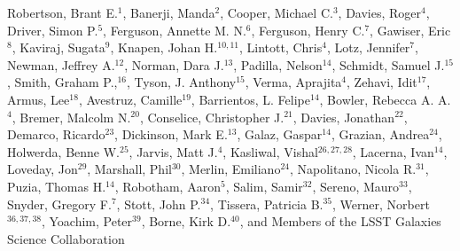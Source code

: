 Robertson, Brant E.$^{1}$, 
Banerji, Manda$^{2}$,
Cooper, Michael C.$^{3}$,
Davies, Roger$^{4}$,
Driver, Simon P.$^{5}$,
Ferguson, Annette M. N.$^{6}$,
Ferguson, Henry C.$^{7}$,
Gawiser, Eric$^{8}$,
Kaviraj, Sugata$^{9}$,
Knapen, Johan H.$^{10,11}$,
Lintott, Chris$^{4}$,
Lotz, Jennifer$^{7}$,
Newman, Jeffrey A.$^{12}$,
Norman, Dara J.$^{13}$,
Padilla, Nelson$^{14}$,
Schmidt, Samuel J.$^{15}$,
Smith, Graham P.,$^{16}$,
Tyson, J. Anthony$^{15}$,
Verma, Aprajita$^{4}$,
Zehavi, Idit$^{17}$,
Armus, Lee$^{18}$,
Avestruz, Camille$^{19}$,
Barrientos, L. Felipe$^{14}$,
Bowler, Rebecca A. A.$^{4}$,
Bremer, Malcolm N.$^{20}$,
Conselice, Christopher J.$^{21}$,
Davies, Jonathan$^{22}$,
Demarco, Ricardo$^{23}$,
Dickinson, Mark E.$^{13}$,
Galaz, Gaspar$^{14}$,
Grazian, Andrea$^{24}$,
Holwerda, Benne W.$^{25}$,
Jarvis, Matt J.$^{4}$,
Kasliwal, Vishal$^{26,27,28}$,
Lacerna, Ivan$^{14}$,
Loveday, Jon$^{29}$,
Marshall, Phil$^{30}$,
Merlin, Emiliano$^{24}$,
Napolitano, Nicola R.$^{31}$,
Puzia, Thomas H.$^{14}$,
Robotham, Aaron$^{5}$,
Salim, Samir$^{32}$,
Sereno, Mauro$^{33}$,
Snyder, Gregory F.$^{7}$,
Stott, John P.$^{34}$,
Tissera, Patricia B.$^{35}$,
Werner, Norbert$^{36,37,38}$,
Yoachim, Peter$^{39}$,
Borne, Kirk D.$^{40}$,
and Members of the LSST Galaxies Science Collaboration 

\vspace*{5mm}

